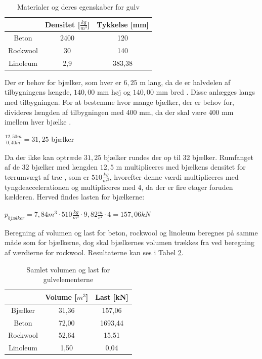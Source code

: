\begin{table}
	\begin{center}
		\begin{tabular}{|c|c|c|}
			\hline
			& Densitet [$\frac{kg}{m^3}$] & Tykkelse [mm] \\ \hline
			Beton    & 2400     & 120      \\ \hline
			Rockwool & 30       & 140      \\ \hline
			Linoleum & 2,9      & 383,38  \\ \hline
		\end{tabular}
		\caption{Materialer og deres egenskaber for gulv}
		\label{tab:densi}
	\end{center}
\end{table}

Der er behov for bjælker, som hver er $6,\!25$ m lang, da de er halvdelen af tilbygningens længde, $140,\!00$ mm høj og $140,\!00$ mm bred \citep{granse}. Disse anlægges langs med tilbygningen. For at bestemme hvor mange bjælker, der er behov for, divideres længden af tilbygningen med 400 mm, da der skal være 400 mm imellem hver bjælke \citep{Gulvopbygning}. 

\begin{center}
	$\frac{12,\!50 m}{0,\!40 m}=31,\!25$ bjælker
\end{center} 

Da der ikke kan optræde $31,\!25$ bjælker rundes der op til 32 bjælker.
\newline
\newline
Rumfanget af de 32 bjælker med længden $12,\!5$ m multipliceres med bjælkens densitet for tørrumvægt af træ \citep{torrumvagt}, som er $510 \frac{kg}{m^3}$, hvorefter denne værdi multipliceres med tyngdeaccelerationen og multipliceres med 4, da der er fire etager foruden kælderen. Herved findes lasten for bjælkerne: 
\begin{center}
	$p_{bjælker} = 7,\!84 m^3\cdot 510 \frac{kg}{m^3}\cdot 9,\!82 \frac{m}{s^2}\cdot 4 = 157,\!06 kN$
\end{center}

Beregning af volumen og last for beton, rockwool og linoleum beregnes på samme måde som for bjælkerne, dog skal bjælkernes volumen trækkes fra ved beregning af værdierne for rockwool. Resultaterne kan ses i Tabel \ref{tab:gulv}.

\begin{table}
	\begin{center}
		\begin{tabular}{|c|c|c|}
			\hline
			& Volume [$m^3$] & Last [kN] \\ \hline
			Bjælker	 & 31,36 & 157,06	\\ \hline
			Beton    & 72,00 & 1693,44     \\ \hline
			Rockwool & 52,64 & 15,51     \\ \hline
			Linoleum & 1,50 & 0,04     \\ \hline
		\end{tabular}
		\caption{Samlet volumen og last for gulvelementerne}
		\label{tab:gulv}
	\end{center}
\end{table}

